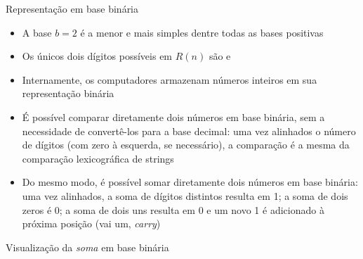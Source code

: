 \begin{frame}[fragile]{Representação em base binária}

    \begin{itemize}
        \item A base $b = 2$ é a menor e mais simples dentre todas as bases positivas

        \item Os únicos dois dígitos possíveis em $R(n)$ são  e 

        \item Internamente, os computadores armazenam números inteiros em sua representação
            binária

        \item É possível comparar diretamente dois números em base binária, sem a necessidade de 
        convertê-los para a base decimal: uma vez alinhados o número de dígitos (com zero à
        esquerda, se necessário), a comparação é a mesma da comparação lexicográfica de strings

        \item Do mesmo modo, é possível somar diretamente dois números em base binária: uma
            vez alinhados, a soma de dígitos distintos resulta em 1; a soma de dois zeros é 
            0; a soma de dois uns resulta em 0 e um novo 1 é adicionado à próxima posição
            (vai um, \textit{carry})

    \end{itemize}

\end{frame}

\begin{frame}[fragile]{Visualização da \textit{soma} em base binária}


\end{frame}

